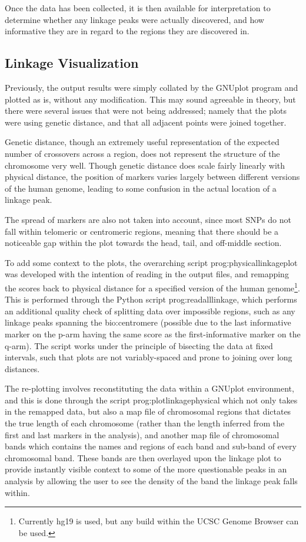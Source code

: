 Once the data has been collected, it is then available for interpretation to determine whether any linkage peaks were actually discovered, and how informative they are in regard to the regions they are discovered in.

\subsection{Linkage Visualization}

Previously, the output results were simply collated by the GNUplot program and plotted as is, without any modification. This may sound agreeable in theory, but there were several issues that were not being addressed; namely that the plots were using genetic distance, and that all adjacent points were joined together.

Genetic distance, though an extremely useful representation of the expected number of crossovers across a region, does not represent the structure of the chromosome very well. Though genetic distance does scale fairly linearly with physical distance, the position of markers varies largely between different versions of the human genome, leading to some confusion in the actual location of a linkage peak.

The spread of markers are also not taken into account, since most SNPs do not fall within telomeric or centromeric regions, meaning that there should be a noticeable gap within the plot towards the head, tail, and off-middle section.

To add some context to the plots, the overarching script \gls{prog:physicallinkageplot} was developed with the intention of reading in the output files, and remapping the scores back to physical distance for a specified version of the human genome\footnote{Currently hg19 is used, but any build within the UCSC Genome Browser can be used.}. This is performed through the Python script \gls{prog:readalllinkage}, which performs an additional quality check of splitting data over impossible regions, such as any linkage peaks spanning the \gls{bio:centromere} (possible due to the last informative marker on the p-arm having the same score as the first-informative marker on the q-arm). The script works under the principle of bisecting the data at fixed intervals, such that plots are not variably-spaced and prone to joining over long distances.

The re-plotting involves reconstituting the data within a GNUplot environment, and this is done through the script \gls{prog:plotlinkagephysical} which not only takes in the remapped data, but also a map file of chromosomal regions that dictates the true length of each chromosome (rather than the length inferred from the first and last markers in the analysis), and another map file of chromosomal bands which contains the names and regions of each band and sub-band of every chromosomal band. These bands are then overlayed upon the linkage plot to provide instantly visible context to some of the more questionable peaks in an analysis by allowing the user to see the density of the band the linkage peak falls within. \enlargethispage{\baselineskip}

